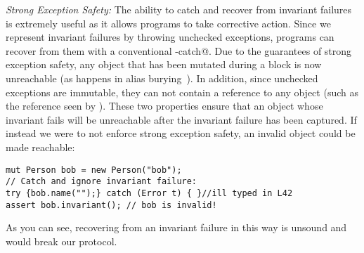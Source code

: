 \textit{Strong Exception Safety:}
The ability to catch and recover from invariant failures is extremely useful as it allows programs to take corrective action.
Since we represent invariant failures by throwing unchecked exceptions, programs can recover from them with a conventional \Q@try-catch@.
	Due to the guarantees of strong exception safety, any object that has been mutated during a \Q@try@ block is now unreachable (as happens in alias burying~\cite{boyland2001alias}). In addition, since unchecked exceptions are immutable, they can not contain a \Q@read@ reference to any object (such as the \Q@this@ reference seen by \Q@invariant@). These two properties ensure that an object whose invariant fails will be unreachable after the invariant failure has been captured. %
If instead we were to not enforce strong exception safety, an invalid object could be made reachable:
\saveSpace
\begin{lstlisting}[morekeywords={assert}, escapechar=\%]
mut Person bob = new Person("bob");
// Catch and ignore invariant failure:
try {bob.name("");} catch (Error t) { }//ill typed in L42
assert bob.invariant(); // bob is invalid!
\end{lstlisting}
\saveSpace
As you can see, recovering from an invariant failure in this way is unsound and would break our protocol.







